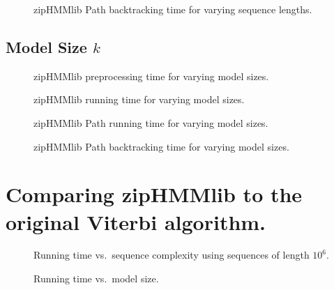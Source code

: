 \documentclass[11pt,twoside,a4,danish,english,report]{memoir}
\begin{document}
\begin{figure}[H]
  \centering
  
  \caption{zipHMMlib Path backtracking time for varying sequence lengths.}
  \label{fig:assymptotic_viterbi_backtrack_n}
\end{figure}

\subsection{Model Size $k$}
\label{sec:model-size-k}

\begin{figure}[H]
  \centering
  
  \caption{zipHMMlib preprocessing time for varying model sizes.}
  \label{fig:pre_viterbi_k}
\end{figure}

\begin{figure}[H]
  \centering
  
  \caption{zipHMMlib running time for varying model sizes.}
  \label{fig:assymptotic_viterbi_k}
\end{figure}

\begin{figure}[H]
  \centering
  
  \caption{zipHMMlib Path running time for varying model sizes.}
  \label{fig:assymptotic_viterbi_path_k}
\end{figure}

\begin{figure}[H]
  \centering
  
  \caption{zipHMMlib Path backtracking time for varying model sizes.}
  \label{fig:assymptotic_viterbi_backtrack_k}
\end{figure}

\section{Comparing zipHMMlib to the original Viterbi algorithm.}
\label{sec:comp-ziphmml-orig}

\begin{figure}[H]
  \centering
  
  \caption{Running time vs.\ sequence complexity using sequences of length $10^6$.}
  \label{fig:speedup_vs_complexity}
\end{figure}

\begin{figure}[H]
  \centering
  
  \caption{Running time vs.\ model size.}
  \label{fig:speedup_vs_k}
\end{figure}
\end{document}
